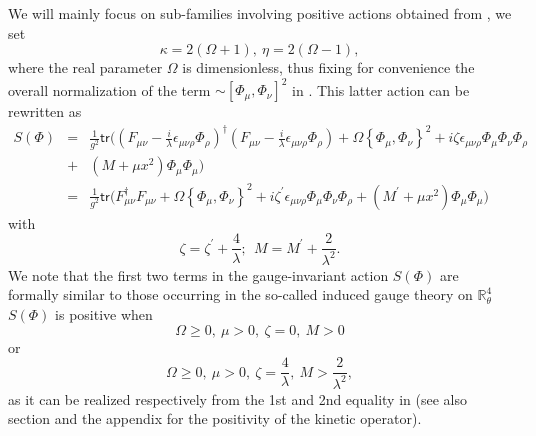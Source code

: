 \documentclass[10pt]{book}
\newcommand{\tr}{\mathsf{tr}}
\theoremstyle{break}
\begin{document}
%
We will mainly focus on sub-families involving positive actions obtained from %
, we set%
%
\begin{equation}
\kappa= 2(\Omega+1),\ \eta= 2(\Omega-1), %
\end{equation}
%
where the real parameter $\Omega$ is dimensionless, thus fixing for convenience the overall normalization of the term $\sim[\Phi_\mu,\Phi_\nu]^2$ in %
. This latter action can be rewritten as
\begin{eqnarray}
S(\Phi)&=&\frac{1}{g^2} \tr\big((F_{\mu\nu} - \frac{i}{\lambda} \epsilon_{\mu\nu\rho} \Phi_\rho)^\dag (F_{\mu\nu} - \frac{i}{\lambda} \epsilon_{\mu\nu\rho} \Phi_\rho) + \Omega\left\{\Phi_\mu,\Phi_\nu\right\}^2
+i \zeta \epsilon_{\mu\nu\rho} \Phi_\mu \Phi_\nu \Phi_\rho\nonumber\\
&+& (M+\mu x^2) \Phi_\mu \Phi_\mu \big)\nonumber\\
&=&\frac{1}{g^2} \tr\big(F^\dag_{\mu\nu}F_{\mu\nu} + \Omega\left\{\Phi_\mu,\Phi_\nu\right\}^2 + i \zeta^\prime\epsilon_{\mu\nu\rho} \Phi_\mu \Phi_\nu \Phi_\rho + \left(M^\prime+\mu x^2\right) \Phi_\mu \Phi_\mu \big)%
\end{eqnarray}
with
\begin{equation}
\zeta = \zeta^\prime+\frac{4}{\lambda};\ \ M=M^\prime+\frac{2}{\lambda^2}. %
\end{equation}
We note that the first two terms in the gauge-invariant action $S(\Phi)$ %
are formally similar to those occurring in the so-called induced gauge theory on $\mathbb{R}^4_\theta$ %
$S(\Phi)$ is positive when 
\begin{equation}
\Omega\ge0,\ \mu>0,\ \zeta=0,\ M>0%
\end{equation}
or
\begin{equation}
\Omega\ge0,\ \mu>0,\ \zeta=\frac{4}{\lambda},\ M>\frac{2}{\lambda^2}, 
\end{equation}
as it can be realized respectively from the 1st and 2nd equality in %
(see also section %
and the appendix for the positivity of the kinetic operator).\par
\end{document}
